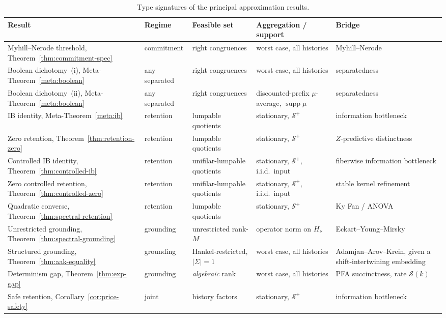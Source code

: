 \documentclass[12pt]{article}
\theoremstyle{definition}
\newcommand{\Splus}{\mathcal S^{+}}
\begin{document}
\begin{table}[htbp]
\centering
\small
\caption{Type signatures of the principal approximation results.}
\label{tab:type-signatures}
\begin{tabular}{@{}p{3.5cm}p{2.0cm}p{2.4cm}p{2.2cm}p{3.0cm}@{}}
\toprule
\textbf{Result} & \textbf{Regime} & \textbf{Feasible set} &
\textbf{Aggregation / support} & \textbf{Bridge} \\
\midrule
Myhill--Nerode threshold,
Theorem~\ref{thm:commitment-spec}
& commitment & right congruences & worst case, all histories
& Myhill--Nerode \\[2pt]
Boolean dichotomy~(i),
Meta-Theorem~\ref{meta:boolean}
& any separated & right congruences & worst case, all histories
& separatedness \\[2pt]
Boolean dichotomy~(ii),
Meta-Theorem~\ref{meta:boolean}
& any separated & right congruences & discounted-prefix $\mu$-average,
$\operatorname{supp}\mu$ & separatedness \\[2pt]
IB identity,
Meta-Theorem~\ref{meta:ib}
& retention & lumpable quotients & stationary, $\Splus$
& information bottleneck \\[2pt]
Zero retention,
Theorem~\ref{thm:retention-zero}
& retention & lumpable quotients & stationary, $\Splus$
& $Z$-predictive distinctness \\[2pt]
Controlled IB identity,
Theorem~\ref{thm:controlled-ib}
& retention & unifilar-lumpable quotients
& stationary, $\Splus$, i.i.d.\ input
& fiberwise information bottleneck \\[2pt]
Zero controlled retention,
Theorem~\ref{thm:controlled-zero}
& retention & unifilar-lumpable quotients
& stationary, $\Splus$, i.i.d.\ input
& stable kernel refinement \\[2pt]
Quadratic converse,
Theorem~\ref{thm:spectral-retention}
& retention & lumpable quotients & stationary, $\Splus$
& Ky Fan / ANOVA \\[2pt]
Unrestricted grounding,
Theorem~\ref{thm:spectral-grounding}
& grounding & unrestricted rank-$M$ & operator norm on $H_\nu$
& Eckart--Young--Mirsky \\[2pt]
Structured grounding,
Theorem~\ref{thm:aak-equality}
& grounding & Hankel-restricted, $|\Sigma|=1$ & worst case, all histories
& Adamjan--Arov--Krein, given a shift-intertwining embedding \\[2pt]
Determinism gap,
Theorem~\ref{thm:exp-gap}
& grounding & \emph{algebraic} rank & worst case, all histories
& PFA succinctness, rate $\mathcal S(k)$ \\[2pt]
Safe retention,
Corollary~\ref{cor:price-safety}
& joint & history factors & stationary, $\Splus$
& information bottleneck \\
\bottomrule
\end{tabular}
\end{table}
\end{document}
